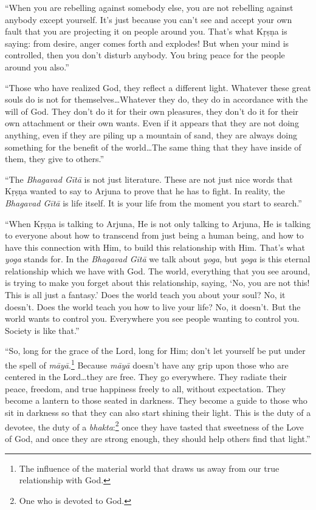 \enquote{When you are rebelling against somebody else, you are not rebelling against anybody except yourself. It’s just because you can’t see and accept your own fault that you are projecting it on people around you. That’s what Kṛṣṇa is saying: from desire, anger comes forth and explodes! But when your mind is controlled, then you don’t disturb anybody. You bring peace for the people around you also.}

\enquote{Those who have realized God, they reflect a different light. Whatever these great souls do is not for themselves\ldots Whatever they do, they do in accordance with the will of God. They don’t do it for their own pleasures, they don’t do it for their own attachment or their own wants. Even if it appears that they are not doing anything, even if they are piling up a mountain of sand, they are always doing something for the benefit of the world\ldots The same thing that they have inside of them, they give to others.}

\enquote{The \textit{Bhagavad Gītā} is not just literature. These are not just nice words that Kṛṣṇa wanted to say to Arjuna to prove that he has to fight. In reality, the \textit{Bhagavad Gītā} is life itself. It is your life from the moment you start to search.}

\enquote{When Kṛṣṇa is talking to Arjuna, He is not only talking to Arjuna, He is talking to everyone about how to transcend from just being a human being, and how to have this connection with Him, to build this relationship with Him. That’s what \textit{yoga} stands for. In the \textit{Bhagavad Gītā} we talk about \textit{yoga}, but \textit{yoga} is this eternal relationship which we have with God. The world, everything that you see around, is trying to make you forget about this relationship, saying, \enquote{No, you are not this! This is all just a fantasy.} Does the world teach you about your soul? No, it doesn’t. Does the world teach you how to live your life? No, it doesn’t. But the world wants to control you. Everywhere you see people wanting to control you. Society is like that.}



\enquote{So, long for the grace of the Lord, long for Him; don’t let yourself be put under the spell of \textit{māyā}.\footnote{The influence of the material world that draws us away from our true relationship with God.} Because \textit{māyā} doesn’t have any grip upon those who are centered in the Lord\ldots they are free. They go everywhere. They radiate their peace, freedom, and true happiness freely to all, without expectation. They become a lantern to those seated in darkness. They become a guide to those who sit in darkness so that they can also start shining their light. This is the duty of a devotee, the duty of a \textit{bhakta}:\footnote{One who is devoted to God.} once they have tasted that sweetness of the Love of God, and once they are strong enough, they should help others find that light.}
